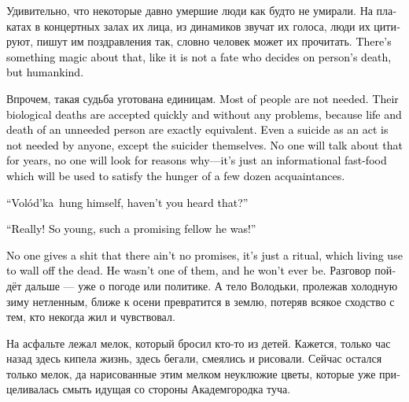 \documentclass[a5paper,12pt,fleqn]{extbook}\usepackage{cooltooltips}\usepackage{polyglossia}\setdefaultlanguage[babelshorthands=true]{russian}\setotherlanguage{english}\defaultfontfeatures{Ligatures=TeX,Mapping=tex-text} \usepackage{xcolor}\definecolor{lightgray}{HTML}{bbbbbb}\color{lightgray}\newcommand{\ml}[3]{\textenglish{\textcolor{black}{#3}}}
\newcommand{\Volodka}{Vol\'od'ka}
\begin{document}
Удивительно, что некоторые давно умершие люди как будто не умирали.
На плакатах в концертных залах их лица, из динамиков звучат их голоса, люди их цитируют, пишут им поздравления так, словно человек может их прочитать.
\ml{$0$}
{И в этом есть какая-то магия "--- словно это не судьбе решать, умер человек или нет, а человечеству.}
{There's something magic about that, like it is not a fate who decides on person's death, but humankind.}

Впрочем, такая судьба уготована единицам.
\ml{$0$}
{Большая часть людей никому не нужны.}
{Most of people are not needed.}
\ml{$0$}
{Их биологическую смерть признают быстро и без каких-либо сложностей, потому что жизнь и смерть ненужного человека совершенно равноценны.}
{Their biological deaths are accepted quickly and without any problems, because life and death of an unneeded person are exactly equivalent.}
\ml{$0$}
{Даже самоубийство, по сути, не нужно никому, кроме собственно самоубийцы.}
{Even a suicide as an act is not needed by anyone, except the suicider themselves.}
\ml{$0$}
{О нём не будут говорить годами, никто не будет доискиваться причин, это будет информационный фастфуд, которым утолят свой голод пара десятков знакомых.}
{No one will talk about that for years, no one will look for reasons why---it's just an informational fast-food which will be used to satisfy the hunger of a few dozen acquaintances.}

\ml{$0$}
{--- А Володька-то повесился, слышала?}
{``\Volodka\ hung himself, haven't you heard that?''}

\ml{$0$}
{--- Да ты что!}
{``Really!}
\ml{$0$}
{Такой молодой, такие надежды подавал!}
{So young, such a promising fellow he was!''}

\ml{$0$}
{Всем уже совершенно неважно, что никаких надежд не было --- это просто ритуал, которым живые пытаются отгородиться от покойника.}
{No one gives a shit that there ain't no promises, it's just a ritual, which living use to wall off the dead.}
\ml{$0$}
{Он не был одним из них, и больше уже не будет.}
{He wasn't one of them, and he won't ever be.}
Разговор пойдёт дальше --- уже о погоде или политике.
А тело Володьки, пролежав холодную зиму нетленным, ближе к осени превратится в землю, потеряв всякое сходство с тем, кто некогда жил и чувствовал.

На асфальте лежал мелок, который бросил кто-то из детей.
Кажется, только час назад здесь кипела жизнь, здесь бегали, смеялись и рисовали.
Сейчас остался только мелок, да нарисованные этим мелком неуклюжие цветы, которые уже прицеливалась смыть идущая со стороны Академгородка туча.
\end{document}

